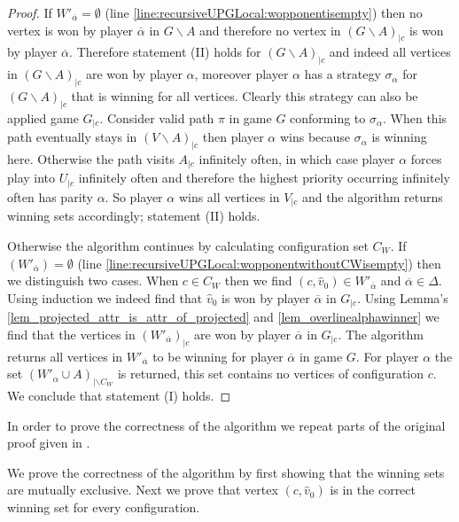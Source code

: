 \begin{theorem}
\begin{proof}
		If $W'_{\overline{\alpha}} = \emptyset$ (line \ref{line:recursiveUPGLocal:wopponentisempty}) then no vertex is won by player $\overline{\alpha}$ in $G\backslash A$ and therefore no vertex in $(G\backslash A)_{|c}$ is won by player $\overline{\alpha}$. Therefore statement (II) holds for $(G\backslash A)_{|c}$ and indeed all vertices in $(G\backslash A)_{|c}$ are won by player $\alpha$, moreover player $\alpha$ has a strategy $\sigma_\alpha$ for $(G\backslash A)_{|c}$ that is winning for all vertices. Clearly this strategy can also be applied game $G_{|c}$. Consider valid path $\pi$ in game $G$ conforming to $\sigma_\alpha$. When this path eventually stays in $(V \backslash A)_{|c}$ then player $\alpha$ wins because $\sigma_\alpha$ is winning here. Otherwise the path visits $A_{|c}$ infinitely often, in which case player $\alpha$ forces play into $U_{|c}$ infinitely often and therefore the highest priority occurring infinitely often has parity $\alpha$. So player $\alpha$ wins all vertices in $V_{|c}$ and the algorithm returns winning sets accordingly; statement (II) holds.
		
		Otherwise the algorithm continues by calculating configuration set $C_W$. If $(W'_{\overline{\alpha}}) = \emptyset$ (line \ref{line:recursiveUPGLocal:wopponentwithoutCWisempty}) then we distinguish two cases. When $c \in C_W$ then we find $(c,\hat{v}_0) \in W'_{\overline{\alpha}}$ and $\overline{\alpha} \in \Delta$. Using induction we indeed find that $\hat{v}_0$ is won by player $\overline{\alpha}$ in $G_{|c}$. Using Lemma's \ref{lem_projected_attr_is_attr_of_projected} and \ref{lem_overlinealphawinner} we find that the vertices in $(W'_{\overline{\alpha}})_{|c}$ are won by player $\overline{\alpha}$ in $G_{|c}$. The algorithm returns all vertices in $W'_{\overline{\alpha}}$ to be winning for player $\overline{\alpha}$ in game $G$. For player $\alpha$ the set $(W'_\alpha \cup A)_{|\backslash C_W}$ is returned, this set contains no vertices of configuration $c$. We conclude that statement (I) holds.
	\end{proof}
\end{theorem}
		
		
		
		
		
		

In order to prove the correctness of the algorithm we repeat parts of the original proof given in \cite{ZIELONKA1998135}. 

We prove the correctness of the algorithm by first showing that the winning sets are mutually exclusive. Next we prove that vertex $(c,\hat{v}_0)$ is in the correct winning set for every configuration.

